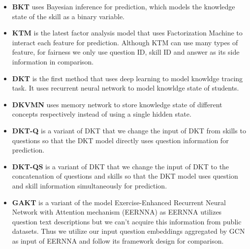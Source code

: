 \documentclass[runningheads]{llncs}
\begin{document}
\begin{itemize}
	\item \textbf{BKT} \cite{corbett1994knowledge} uses Bayesian inference for prediction, which models the knowledge state of the skill as a binary variable. 
	
	\item \textbf{KTM} \cite{vie2019knowledge} is the latest factor analysis model that uses Factorization Machine to interact each feature for prediction. Although KTM can use many types of feature, for fairness we only use question ID, skill ID and answer as its side information in comparison.
	
	
	\item \textbf{DKT} \cite{dkt} is the first method that uses deep learning to model knowldge tracing task. It uses recurrent neural network to model knowldge state of students.
	
	\item \textbf{DKVMN} \cite{dkvmn} uses memory network to store knowledge state of different concepts respectively instead of using a single hidden state.
	
	\item \textbf{DKT-Q} is a variant of DKT that we change the input of DKT from skills to questions so that the DKT model directly uses question information for prediction.
	
	\item \textbf{DKT-QS} is a variant of DKT that we change the input of DKT to the concatenation of questions and skills so that the DKT model uses question and skill information simultaneously for prediction.
	
	\item \textbf{GAKT} is a variant of the model  Exercise-Enhanced Recurrent Neural Network with Attention mechanism (EERNNA) \cite{su2018exercise} as EERNNA utilizes question text descriptions but we can't acquire this information from public datasets. Thus we utilize our input question embeddings aggregated by GCN as input of EERNNA and follow its framework design for comparison.
	
\end{itemize}
\end{document}
